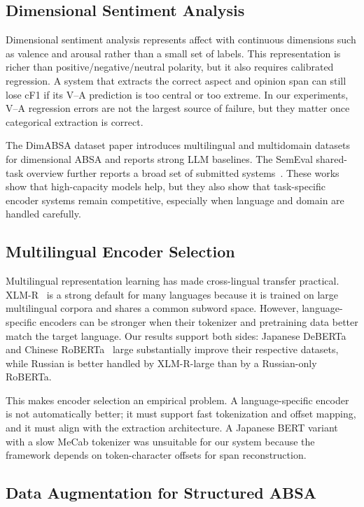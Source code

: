 \documentclass[runningheads]{llncs}
\begin{document}
\subsection{Dimensional Sentiment Analysis}

Dimensional sentiment analysis represents affect with continuous
dimensions such as valence and arousal rather than a small set of
labels. This representation is richer than positive/negative/neutral
polarity, but it also requires calibrated regression. A system that
extracts the correct aspect and opinion span can still lose cF1 if its
V--A prediction is too central or too extreme. In our experiments,
V--A regression errors are not the largest source of failure, but they
matter once categorical extraction is correct.

The DimABSA dataset paper introduces multilingual and multidomain
datasets for dimensional ABSA and reports strong LLM baselines. The
SemEval shared-task overview further reports a broad set of submitted
systems~\cite{dimabsa2026,overview2026}. These works show that high-capacity models help, but they
also show that task-specific encoder systems remain competitive,
especially when language and domain are handled carefully.

\subsection{Multilingual Encoder Selection}

Multilingual representation learning has made cross-lingual transfer
practical. XLM-R~\cite{conneau2020xlmr} is a strong default for many languages because it is
trained on large multilingual corpora and shares a common subword
space. However, language-specific encoders can be stronger when their
tokenizer and pretraining data better match the target language. Our
results support both sides: Japanese DeBERTa~\cite{he2023deberta} and Chinese RoBERTa~\cite{liu2019roberta}
large substantially improve their respective datasets, while Russian
is better handled by XLM-R-large than by a Russian-only RoBERTa.

This makes encoder selection an empirical problem. A language-specific encoder is
not automatically better; it must support fast tokenization and offset
mapping, and it must align with the extraction architecture. A Japanese
BERT variant with a slow MeCab tokenizer was unsuitable for our system
because the framework depends on token-character offsets for span
reconstruction.

\subsection{Data Augmentation for Structured ABSA}
\end{document}

